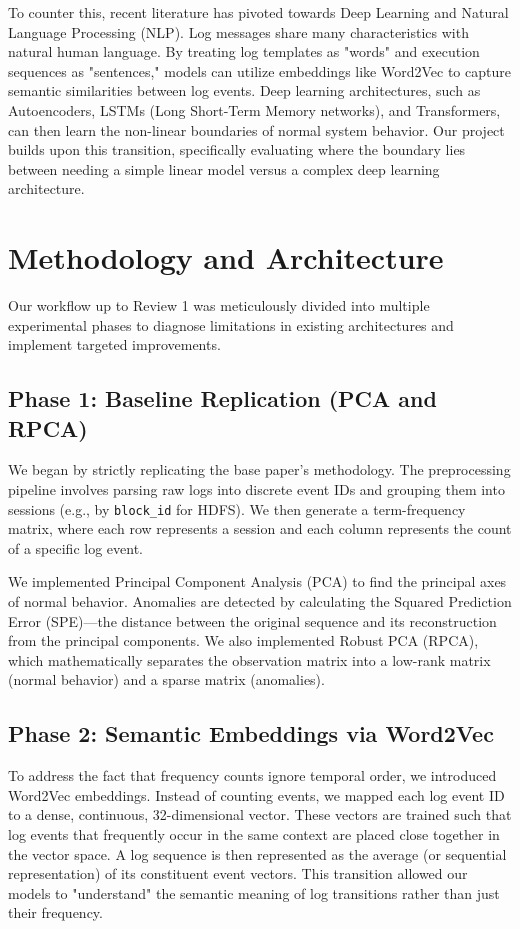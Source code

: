 \documentclass[12pt]{article}
\begin{document}
To counter this, recent literature has pivoted towards Deep Learning and Natural Language Processing (NLP). Log messages share many characteristics with natural human language. By treating log templates as "words" and execution sequences as "sentences," models can utilize embeddings like Word2Vec to capture semantic similarities between log events. Deep learning architectures, such as Autoencoders, LSTMs (Long Short-Term Memory networks), and Transformers, can then learn the non-linear boundaries of normal system behavior. Our project builds upon this transition, specifically evaluating where the boundary lies between needing a simple linear model versus a complex deep learning architecture.

\section{Methodology and Architecture}
Our workflow up to Review 1 was meticulously divided into multiple experimental phases to diagnose limitations in existing architectures and implement targeted improvements.

\subsection{Phase 1: Baseline Replication (PCA and RPCA)}
We began by strictly replicating the base paper's methodology. The preprocessing pipeline involves parsing raw logs into discrete event IDs and grouping them into sessions (e.g., by \texttt{block\_id} for HDFS). We then generate a term-frequency matrix, where each row represents a session and each column represents the count of a specific log event.

We implemented Principal Component Analysis (PCA) to find the principal axes of normal behavior. Anomalies are detected by calculating the Squared Prediction Error (SPE)---the distance between the original sequence and its reconstruction from the principal components. We also implemented Robust PCA (RPCA), which mathematically separates the observation matrix into a low-rank matrix (normal behavior) and a sparse matrix (anomalies). 

\subsection{Phase 2: Semantic Embeddings via Word2Vec}
To address the fact that frequency counts ignore temporal order, we introduced Word2Vec embeddings. Instead of counting events, we mapped each log event ID to a dense, continuous, 32-dimensional vector. These vectors are trained such that log events that frequently occur in the same context are placed close together in the vector space. A log sequence is then represented as the average (or sequential representation) of its constituent event vectors. This transition allowed our models to "understand" the semantic meaning of log transitions rather than just their frequency.
\end{document}
